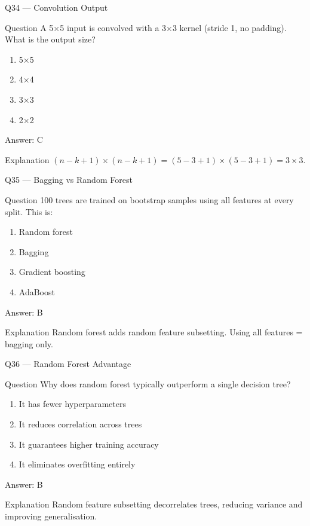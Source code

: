 \documentclass[aspectratio=169,8pt]{beamer}
\begin{document}
	\begin{frame}{Q34 --- Convolution Output}
		\begin{block}{Question}
			A 5×5 input is convolved with a 3×3 kernel (stride 1, no padding). What is the output size?
		\end{block}
		\begin{enumerate}
			\item 5×5
			\item 4×4
			\item 3×3
			\item 2×2
		\end{enumerate}
		\begin{exampleblock}{Answer: C}\end{exampleblock}
		\begin{block}{Explanation}
			$(n-k+1)\times(n-k+1)=(5-3+1)\times(5-3+1)=3\times 3$.
		\end{block}
	\end{frame}
	
	\begin{frame}{Q35 --- Bagging vs Random Forest}
		\begin{block}{Question}
			100 trees are trained on bootstrap samples using all features at every split. This is:
		\end{block}
		\begin{enumerate}
			\item Random forest
			\item Bagging
			\item Gradient boosting
			\item AdaBoost
		\end{enumerate}
		\begin{exampleblock}{Answer: B}\end{exampleblock}
		\begin{block}{Explanation}
			Random forest adds random feature subsetting. Using all features = bagging only.
		\end{block}
	\end{frame}
	
	\begin{frame}{Q36 --- Random Forest Advantage}
		\begin{block}{Question}
			Why does random forest typically outperform a single decision tree?
		\end{block}
		\begin{enumerate}
			\item It has fewer hyperparameters
			\item It reduces correlation across trees
			\item It guarantees higher training accuracy
			\item It eliminates overfitting entirely
		\end{enumerate}
		\begin{exampleblock}{Answer: B}\end{exampleblock}
		\begin{block}{Explanation}
			Random feature subsetting decorrelates trees, reducing variance and improving generalisation.
		\end{block}
	\end{frame}
	
\end{document}
